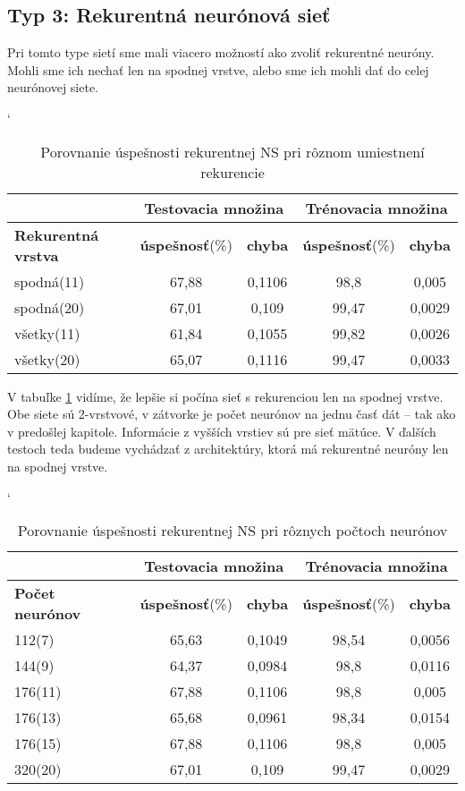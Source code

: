 \subsection{Typ 3: Rekurentná neurónová sieť}
Pri tomto type sietí sme mali viacero možností ako zvoliť rekurentné neuróny. Mohli sme ich nechať len na spodnej vrstve, alebo sme ich mohli dať do celej neurónovej siete.

\begin{table}[h]
\catcode` %
\centering
\begin{tabular}{|l|c|c|c|c|}
\cline{2-5}
\multicolumn{1}{l}{} & \multicolumn{2}{|c|}{\textbf{Testovacia množina}} & \multicolumn{2}{c|}{\textbf{Trénovacia množina}} \\ 
\hline
\textbf{Rekurentná vrstva} & \textbf{úspešnosť}(\%) & \textbf{chyba} & \textbf{úspešnosť}(\%) & \textbf{chyba}  \\ \hline
spodná(11) &  67,88 & 0,1106 & 98,8 & 0,005  \\ \hline
spodná(20) & 67,01 & 0,109 & 99,47 & 0,0029  \\ \hline
všetky(11) & 61,84 & 0,1055 & 99,82 & 0,0026  \\ \hline
všetky(20) & 65,07 & 0,1116 & 99,47 & 0,0033  \\ \hline
\end{tabular}
\caption{Porovnanie úspešnosti rekurentnej NS pri rôznom umiestnení rekurencie}
\label{tab:reclayercmp}
\end{table}

V tabuľke \ref{tab:reclayercmp} vidíme, že lepšie si počína sieť s rekurenciou len na spodnej vrstve. Obe siete sú 2-vrstvové, v zátvorke je počet neurónov na jednu časť dát -- tak ako v predošlej kapitole. Informácie z vyšších vrstiev sú pre sieť mätúce. V ďalších testoch teda budeme vychádzať z architektúry, ktorá má rekurentné neuróny len na spodnej vrstve.

\begin{table}[h]
\catcode` %
\centering
\begin{tabular}{|l|c|c|c|c|}
\cline{2-5}
\multicolumn{1}{l}{} & \multicolumn{2}{|c|}{\textbf{Testovacia množina}} & \multicolumn{2}{c|}{\textbf{Trénovacia množina}}\\ 
\hline
\textbf{Počet neurónov} & \textbf{úspešnosť}(\%) & \textbf{chyba} & \textbf{úspešnosť}(\%) & \textbf{chyba} \\ \hline
112(7) & 65,63 & 0,1049 & 98,54 & 0,0056  \\ \hline
144(9) & 64,37 & 0,0984 & 98,8 & 0,0116  \\ \hline
176(11) & 67,88 & 0,1106 & 98,8 & 0,005  \\ \hline
176(13) & 65,68 & 0,0961 & 98,34 & 0,0154  \\ \hline
176(15) & 67,88 & 0,1106 & 98,8 & 0,005  \\ \hline %
320(20) & 67,01 & 0,109 & 99,47 & 0,0029 \\ \hline
\end{tabular}
\caption{Porovnanie úspešnosti rekurentnej NS pri rôznych počtoch neurónov}
\label{tab:neuroncountcmp3}
\end{table}

